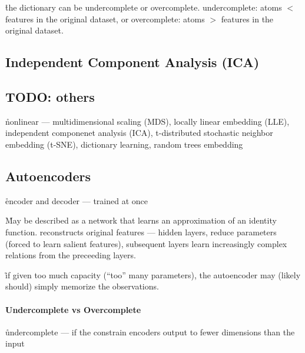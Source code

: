 \r{the dictionary can be undercomplete or overcomplete. undercomplete: atoms $<$ features in the original dataset, or overcomplete: atoms $>$ features in the original dataset.}



\subsection{Independent Component Analysis (ICA)}


\subsection{TODO: others}





\r{nonlinear --- multidimensional scaling (MDS), locally linear embedding (LLE), independent componenet analysis (ICA), t-distributed stochastic neighbor embedding (t-SNE), dictionary learning, random trees embedding}

\subsection{Autoencoders}


\r{encoder and decoder --- trained at once}

\r{May be described as a network that learns an approximation of an identity function. reconstructs original features --- hidden layers, reduce parameters (forced to learn salient features), subsequent layers learn increasingly complex relations from the preceeding layers.}

\r{if given too much capacity (``too'' many parameters), the autoencoder may (likely should) simply memorize the observations.}

\paragraph{Undercomplete vs Overcomplete}
\r{undercomplete --- if the constrain encoders output to fewer dimensions than the input}

